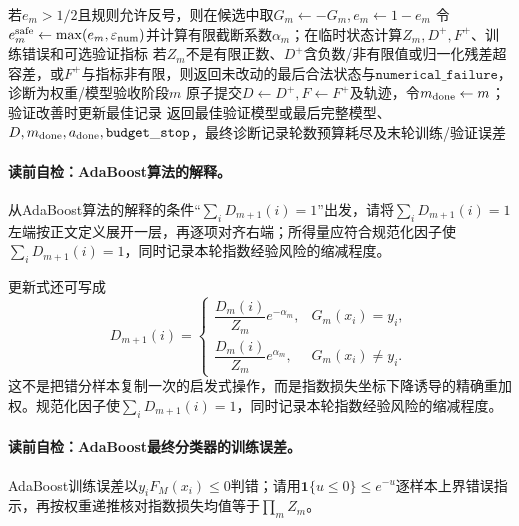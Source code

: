 \begin{AlgorithmContract}
\begin{algorithm}[H]
{  若$e_m>1/2$且规则允许反号，则在候选中取$G_m\leftarrow-G_m,e_m\leftarrow1-e_m$\;
  令$e_m^{\rm safe}\leftarrow\max(e_m,\varepsilon_{\rm num})$并计算有限截断系数$\alpha_m$；在临时状态计算$Z_m,D^+,F^+$、训练错误和可选验证指标\;
  若$Z_m$不是有限正数、$D^+$含负数/非有限值或归一化残差超容差，或$F^+$与指标非有限，则返回未改动的最后合法状态与$\mathtt{numerical\_failure}$，诊断为权重/模型验收阶段$m$\;
  原子提交$D\leftarrow D^+,F\leftarrow F^+$及轨迹，令$m_{\rm done}\leftarrow m$；验证改善时更新最佳记录\;
}
返回最佳验证模型或最后完整模型、$D,m_{\rm done},a_{\rm done},\mathtt{budget\_stop}$，最终诊断记录轮数预算耗尽及末轮训练/验证误差\;
\end{algorithm}
\end{AlgorithmContract}

\paragraph{读前自检：AdaBoost算法的解释。}从AdaBoost算法的解释的条件“$\sum_iD_{m+1}(i)=1$”出发，请将$\sum_iD_{m+1}(i)=1$左端按正文定义展开一层，再逐项对齐右端；所得量应符合规范化因子使$\sum_iD_{m+1}(i)=1$，同时记录本轮指数经验风险的缩减程度。\par

\label{struct:V3-C03-CH12}
更新式还可写成
\[
D_{m+1}(i)=
\begin{cases}
\dfrac{D_m(i)}{Z_m}e^{-\alpha_m},&G_m(x_i)=y_i,\\[6pt]
\dfrac{D_m(i)}{Z_m}e^{\alpha_m},&G_m(x_i)\neq y_i.
\end{cases}
\]
这不是把错分样本复制一次的启发式操作，而是指数损失坐标下降诱导的精确重加权。规范化因子使$\sum_iD_{m+1}(i)=1$，同时记录本轮指数经验风险的缩减程度。


\paragraph{读前自检：AdaBoost最终分类器的训练误差。}AdaBoost训练误差以$y_iF_M(x_i)\le0$判错；请用$\mathbf1\{u\le0\}\le e^{-u}$逐样本上界错误指示，再按权重递推核对指数损失均值等于$\prod_mZ_m$。\par
